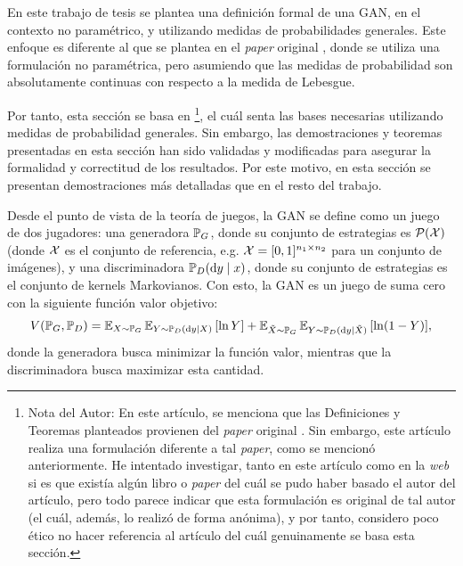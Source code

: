 {{En este trabajo de tesis se plantea una definición formal de una GAN, en el contexto no paramétrico, y utilizando medidas de probabilidades generales. Este enfoque es diferente al que se plantea en el \textit{paper} original \cite{goodfellow2014generative}, donde se utiliza una formulación no paramétrica, pero asumiendo que las medidas de probabilidad son absolutamente continuas con respecto a la medida de Lebesgue.

Por tanto, esta sección se basa en \cite{wikipediagan}\footnote{Nota del Autor: En este artículo, se menciona que las Definiciones y Teoremas planteados provienen del \textit{paper} original \cite{goodfellow2014generative}. Sin embargo, este artículo realiza una formulación diferente a tal \textit{paper}, como se mencionó anteriormente. He intentado investigar, tanto en este artículo como en la \textit{web} si es que existía algún libro o \textit{paper} del cuál se pudo haber basado el autor del artículo, pero todo parece indicar que esta formulación es original de tal autor (el cuál, además, lo realizó de forma anónima), y por tanto, considero poco ético no hacer referencia al artículo del cuál genuinamente se basa esta sección.},
el cuál senta las bases necesarias utilizando medidas de probabilidad generales. Sin embargo, las demostraciones y teoremas presentadas en esta sección han sido validadas y modificadas para asegurar la formalidad y correctitud de los resultados. Por este motivo, en esta sección se presentan demostraciones más detalladas que en el resto del trabajo.

Desde el punto de vista de la teoría de juegos, la GAN se define como un juego de dos jugadores: una generadora $\Prob_G$, donde su conjunto de estrategias es $\ProbSpace[\cX]$ (donde $\cX$ es el conjunto de referencia, e.g. $\cX=[0, 1]^{n_1\times n_2}$ para un conjunto de imágenes), y una discriminadora $\Prob_D(\dd y \mid x)$, donde su conjunto de estrategias es el conjunto de kernels Markovianos. Con esto, la GAN es un juego de suma cero con la siguiente función valor objetivo:
\begin{equation}
    \label{eq:gan-objective}
    V(\Prob_G, \Prob_D)
    = \Exp_{X\sim\Prob_G}{\Exp_{Y \sim \Prob_D(\dd y \mid X)} \left[ \ln Y \right]}
    + \Exp_{\tilde X\sim\Prob_G}{\Exp_{Y \sim \Prob_D(\dd y \mid \tilde X)} \left[ \ln (1 - Y) \right]},
\end{equation}
donde la generadora busca minimizar la función valor, mientras que la discriminadora busca maximizar esta cantidad.

}}
